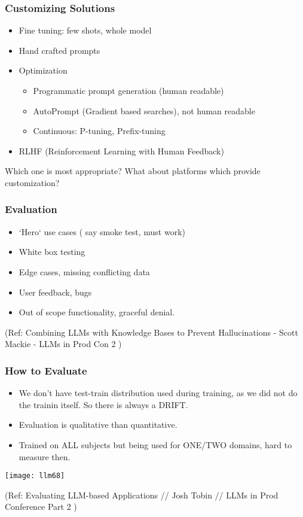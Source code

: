 \begin{frame}[fragile]\frametitle{Customizing Solutions}

\begin{itemize}
\item Fine tuning: few shots, whole model
\item Hand crafted prompts
\item Optimization
	\begin{itemize}
	\item Programmatic prompt generation (human readable)
	\item AutoPrompt (Gradient based searches), not human readable
	\item Continuous: P-tuning, Prefix-tuning
	\end{itemize}
\item RLHF (Reinforcement Learning with Human Feedback)
\end{itemize}	

Which one is most appropriate? What about platforms which provide customization?
\end{frame}


\begin{frame}[fragile]\frametitle{Evaluation}

\begin{itemize}
\item `Hero` use cases ( say smoke test, must work)
\item White box testing
\item Edge cases, missing conflicting data
\item User feedback, bugs
\item Out of scope functionality, graceful denial.
\end{itemize}

{\tiny (Ref: Combining LLMs with Knowledge Bases to Prevent Hallucinations - Scott Mackie - LLMs in Prod Con 2 )}

\end{frame}

\begin{frame}[fragile]\frametitle{How to Evaluate}

\begin{itemize}
\item We don't have test-train distribution used during training, as we did not do the trainin itself. So there is always a DRIFT.
\item Evaluation is qualitative than quantitative.
\item Trained on ALL subjects but being used for ONE/TWO domains, hard to measure then.
\end{itemize}

\begin{center}
\texttt{[image: llm68]}
\end{center}		


{\tiny (Ref: Evaluating LLM-based Applications // Josh Tobin // LLMs in Prod Conference Part 2 )}

\end{frame}

